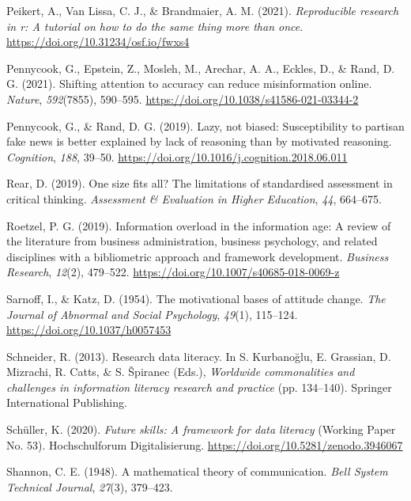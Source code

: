 \documentclass[
  12pt,
  a4paper,
  twoside]{article}
\newlength{\cslhangindent}
\newenvironment{CSLReferences}[2] %
 {\begin{list}{}{%
  \setlength{\itemindent}{0pt}
  \setlength{\leftmargin}{0pt}
  \setlength{\parsep}{0pt}
  \ifodd #1
   \setlength{\leftmargin}{\cslhangindent}
   \setlength{\itemindent}{-1\cslhangindent}
  \fi
  \setlength{\itemsep}{#2\baselineskip}}}
 {\end{list}}
\begin{document}
\begin{CSLReferences}{1}{0}
Peikert, A., Van Lissa, C. J., \& Brandmaier, A. M. (2021).
\emph{Reproducible research in r: A tutorial on how to do the same thing
more than once}. \url{https://doi.org/10.31234/osf.io/fwxs4}

Pennycook, G., Epstein, Z., Mosleh, M., Arechar, A. A., Eckles, D., \&
Rand, D. G. (2021). Shifting attention to accuracy can reduce
misinformation online. \emph{Nature}, \emph{592}(7855), 590--595.
\url{https://doi.org/10.1038/s41586-021-03344-2}

Pennycook, G., \& Rand, D. G. (2019). Lazy, not biased: Susceptibility
to partisan fake news is better explained by lack of reasoning than by
motivated reasoning. \emph{Cognition}, \emph{188}, 39--50.
\url{https://doi.org/10.1016/j.cognition.2018.06.011}

Rear, D. (2019). One size fits all? The limitations of standardised
assessment in critical thinking. \emph{Assessment \& Evaluation in
Higher Education}, \emph{44}, 664--675.

Roetzel, P. G. (2019). Information overload in the information age: A
review of the literature from business administration, business
psychology, and related disciplines with a bibliometric approach and
framework development. \emph{Business Research}, \emph{12}(2), 479--522.
\url{https://doi.org/10.1007/s40685-018-0069-z}

Sarnoff, I., \& Katz, D. (1954). The motivational bases of attitude
change. \emph{The Journal of Abnormal and Social Psychology},
\emph{49}(1), 115--124. \url{https://doi.org/10.1037/h0057453}

Schneider, R. (2013). Research data literacy. In S. Kurbanoğlu, E.
Grassian, D. Mizrachi, R. Catts, \& S. Špiranec (Eds.), \emph{Worldwide
commonalities and challenges in information literacy research and
practice} (pp. 134--140). Springer International Publishing.

Schüller, K. (2020). \emph{Future skills: A framework for data literacy}
(Working Paper No. 53). Hochschulforum Digitalisierung.
\url{https://doi.org/10.5281/zenodo.3946067}

Shannon, C. E. (1948). A mathematical theory of communication.
\emph{Bell System Technical Journal}, \emph{27}(3), 379--423.


\end{CSLReferences}
\end{document}
